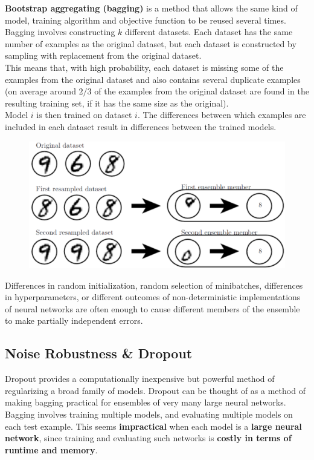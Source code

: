 \begin{multicols}{2}
	\textbf{Bootstrap aggregating (bagging)} is a method that allows the same kind of model, training algorithm and objective function to be reused several times.
	Bagging involves constructing $k$ different datasets. Each dataset has the same number of examples as the original dataset, but each dataset is constructed by sampling with replacement from the original dataset.\\
	This means that, with high probability, each dataset is missing some of the examples from the original dataset and also contains several duplicate examples (on average around $2/3$ of the examples from the original dataset are found in the resulting training set, if it has the same size as the original).\\
	Model $i$ is then trained on dataset $i$. The differences between which examples are included in each dataset result in differences between the trained models.
	\begin{figure}[H]
		\centering
		\includegraphics[width=0.85\linewidth]{images/bagging.PNG}
	\end{figure}
	Differences in random initialization, random selection of minibatches, differences in hyperparameters, or different outcomes of non-deterministic implementations of neural networks are often enough to cause different members of the ensemble to make partially independent errors.
	
	\subsection{Noise Robustness \& Dropout}
	Dropout provides a computationally inexpensive but powerful method of regularizing a broad family of models.
	Dropout can be thought of as a method of making bagging practical for ensembles of very many large neural networks.
	Bagging involves training multiple models, and evaluating multiple models on each test example. 
	This seems \textbf{impractical} when each model is a \textbf{large neural network}, since training and evaluating such networks is \textbf{costly in terms of runtime and memory}.\\
	

\end{multicols}
